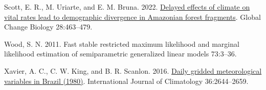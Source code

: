 \documentclass[
]{article}
\newlength{\cslhangindent}
\newlength{\cslentryspacingunit} %
\newenvironment{CSLReferences}[2] %
 {%
  \setlength{\parindent}{0pt}
  \ifodd #1
  \let\oldpar\par
  \def\par{\hangindent=\cslhangindent\oldpar}
  \fi
  \setlength{\parskip}{#2\cslentryspacingunit}
 }%
 {}
\begin{document}
\begin{CSLReferences}{0}{0}
\leavevmode{}%
Scott, E. R., M. Uriarte, and E. M. Bruna. 2022. \href{https://doi.org/10.1111/gcb.15900}{Delayed effects of climate on vital rates lead to demographic divergence in Amazonian forest fragments}. Global Change Biology 28:463--479.

\leavevmode{}%
Wood, S. N. 2011. Fast stable restricted maximum likelihood and marginal likelihood estimation of semiparametric generalized linear models 73:3--36.

\leavevmode{}%
Xavier, A. C., C. W. King, and B. R. Scanlon. 2016. \href{https://doi.org/10.1002/joc.4518}{Daily gridded meteorological variables in {Brazil} (1980)}. International Journal of Climatology 36:2644--2659.

\end{CSLReferences}
\end{document}
